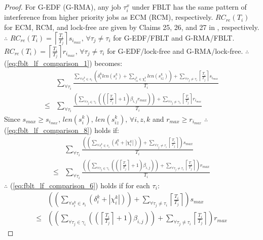 \documentclass[prodmode,acmtecs]{acmsmall}
\begin{document}
\begin{compactenum}
\begin{proof}
For G-EDF (G-RMA),
any job $\tau_{i}^{x}$ under FBLT has the same pattern of interference
from higher priority jobs as ECM (RCM), respectively. $RC_{re}(T_{i})$
for ECM, RCM, and lock-free are given by Claims 25, 26, and 27 in \cite{shambake_phd_proposal}, 
respectively. $\therefore$ $RC_{re}(T_{i})=\left\lceil \frac{T_{i}}{T_{j}}\right\rceil s_{i_{max}},\,\forall\tau_{j}\neq\tau_{i}$ for G-EDF/FBLT and G-RMA/FBLT. $RC_{re}(T_{i})=\left\lceil \frac{T_{i}}{T_{j}}\right\rceil r_{i_{max}},\,\forall\tau_{j}\neq\tau_{i}$ for G-EDF/lock-free and G-RMA/lock-free. 
$\therefore$ (\ref{eq:fblt_lf_comparison_1}) becomes:
\begin{eqnarray}
 & \sum_{\forall\tau_{i}}\frac{\sum_{\forall s_{i}^{k}\in s_{i}}\left(\delta_{i}^{k}len(s_{i}^{k})+\sum_{s_{iz}^{k}\in\chi_{i}^{k}}len(s_{iz}^{k})\right)+\sum_{\forall\tau_{j}\neq\tau_{i}}\left\lceil \frac{T_{i}}{T_{j}}\right\rceil s_{i_{max}}}{T_{i}}\label{eq:fblt_lf_comparison_8}\\
\le & \sum_{\forall\tau_{i}}\frac{\left(\sum_{\forall\tau_{j}\in\gamma_{i}}\left(\left(\left\lceil \frac{T_{i}}{T_{j}}\right\rceil +1\right)\beta_{i,j}r_{max}\right)\right)+\sum_{\forall\tau_{j}\neq\gamma_{i}}\left\lceil \frac{T_{i}}{T_{j}}\right\rceil r_{i_{max}}}{T_{i}}\nonumber 
\end{eqnarray}
Since $s_{max}\ge s_{i_{max}},\, len(s_{i}^{k}),\, len(s_{iz}^{k}),\,\forall i,z,k$
and $r_{max}\ge r_{i_{max}}$ $\therefore$ (\ref{eq:fblt_lf_comparison_8})
holds if: 
\begin{eqnarray}
 & \sum_{\forall\tau_{i}}\frac{\left(\left(\sum_{\forall s_{i}^{k}\in s_{i}}\left(\delta_{i}^{k}+|\chi_{i}^{k}|\right)\right)+\sum_{\forall\tau_{j}\neq\tau_{i}}\left\lceil \frac{T_{i}}{T_{j}}\right\rceil \right)s_{max}}{T_{i}}\label{eq:fblt_lf_comparison_6}\\
\le & \sum_{\forall\tau_{i}}\frac{\left(\left(\sum_{\forall\tau_{j}\in\gamma_{i}}\left(\left(\left\lceil \frac{T_{i}}{T_{j}}\right\rceil +1\right)\beta_{i,j}\right)\right)+\sum_{\forall\tau_{j}\neq\tau_{i}}\left\lceil \frac{T_{i}}{T_{j}}\right\rceil \right)r_{max}}{T_{i}}\nonumber 
\end{eqnarray}
$\therefore$ (\ref{eq:fblt_lf_comparison_6}) holds if for each $\tau_{i}$:
\begin{eqnarray}
 & \left(\left(\sum_{\forall s_{i}^{k}\in s_{i}}\left(\delta_{i}^{k}+|\chi_{i}^{k}|\right)\right)+\sum_{\forall\tau_{j}\neq\tau_{i}}\left\lceil \frac{T_{i}}{T_{j}}\right\rceil \right)s_{max}\label{eq:fblt_lf_comparison_7}\\
\le & \left(\left(\sum_{\forall\tau_{j}\in\gamma_{i}}\left(\left(\left\lceil \frac{T_{i}}{T_{j}}\right\rceil +1\right)\beta_{i,j}\right)\right)+\sum_{\forall\tau_{j}\neq\tau_{i}}\left\lceil \frac{T_{i}}{T_{j}}\right\rceil \right)r_{max}\nonumber 

\end{eqnarray}
\end{proof}
\end{compactenum}
\end{document}
